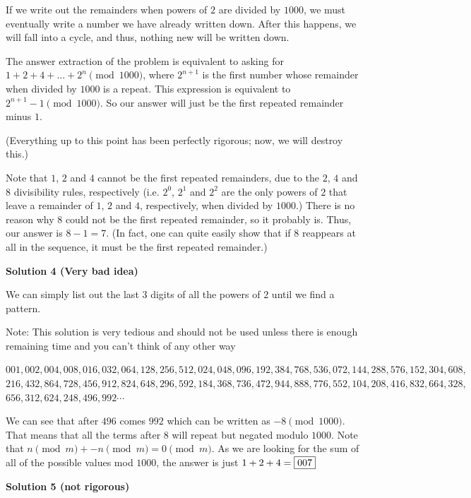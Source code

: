 \begin{enumerate}
If we write out the remainders when powers of $2$ are divided by $1000$, we must eventually write a number we have already written down. After this happens, we will fall into a cycle, and thus, nothing new will be written down.

 The answer extraction of the problem is equivalent to asking for $1+2+4 + \dots + 2^n \pmod{1000}$, where $2^{n+1}$ is the first number whose remainder when divided by $1000$ is a repeat. This expression is equivalent to $2^{n+1}-1 \pmod{1000}$. So our answer will just be the first repeated remainder minus $1$.

 (Everything up to this point has been perfectly rigorous; now, we will destroy this.)

 Note that $1$, $2$ and $4$ cannot be the first repeated remainders, due to the $2$, $4$ and $8$ divisibility rules, respectively (i.e. $2^0$, $2^1$ and $2^2$ are the only powers of $2$ that leave a remainder of $1$, $2$ and $4$, respectively, when divided by $1000$.) There is no reason why $8$ could not be the first repeated remainder, so it probably is. Thus, our answer is $8-1 = \boxed{7}$. (In fact, one can quite easily show that if $8$ reappears at all in the sequence, it must be the first repeated remainder.)

 


 



\textbf{Solution 4 (Very bad idea)}

We can simply list out the last $3$ digits of all the powers of $2$ until we find a pattern. 

 Note: This solution is very tedious and should not be used unless there is enough remaining time and you can't think of any other way

 $001, 002, 004, 008, 016, 032, 064, 128, 256, 512, 024, 048, 096, 192, 384, 768, 536, 072, 144, 288, 576, 152, 304, 608,$ $216, 432, 864, 728, 456, 912, 824, 648, 296, 592, 184, 368, 736, 472, 944, 888, 776, 552, 104, 208, 416, 832, 664, 328,$ $656, 312, 624, 248, 496, 992 \cdots$

 We can see that after $496$ comes $992$ which can be written as $-8 \pmod {1000}$. That means that all the terms after $8$ will repeat but negated modulo $1000$. Note that $n \pmod m + -n \pmod m = 0 \pmod m$. As we are looking for the sum of all of the possible values mod $1000$, the answer is just $1 + 2 + 4 = \fbox{007}$




\textbf{Solution 5 (not rigorous)}


\end{enumerate}
